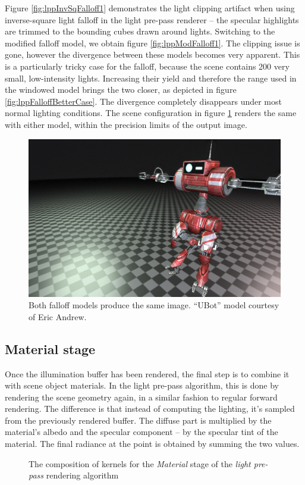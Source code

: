 Figure \ref{fig:lppInvSqFalloff1} demonstrates the light clipping artifact when using inverse-square light falloff in the light pre-pass renderer -- the specular highlights are trimmed to the bounding cubes drawn around lights. Switching to the modified falloff model, we obtain figure \ref{fig:lppModFalloff1}. The clipping issue is gone, however the divergence between these models becomes very apparent. This is a particularly tricky case for the falloff, because the scene contains 200 very small, low-intensity lights. Increasing their yield and therefore the range used in the windowed model brings the two closer, as depicted in figure \ref{fig:lppFalloffBetterCase}. The divergence completely disappears under most normal lighting conditions. The scene configuration in figure \ref{fig:lppFalloffConverged} renders the same with either model, within the precision limits of the output image.

\begin{figure}[h!]
  \centering
    \includegraphics[width=0.45\linewidth]{./Figures/lightPrePass/falloffSame.jpg}
    \caption[Falloffs converged]{Both falloff models produce the same image. ``UBot'' model courtesy of Eric Andrew.}
  \label{fig:lppFalloffConverged}
\end{figure}

\subsection{Material stage}

Once the illumination buffer has been rendered, the final step is to combine it with scene object materials. In the light pre-pass algorithm, this is done by rendering the scene geometry again, in a similar fashion to regular forward rendering. The difference is that instead of computing the lighting, it's sampled from the previously rendered buffer. The diffuse part is multiplied by the material's albedo and the specular component -- by the specular tint of the material. The final radiance at the point is obtained by summing the two values.

\begin{figure}[h!]
  \centering
    \caption[Light Pre-Pass Stage 3]{The composition of kernels for the \emph{Material} stage of the  \emph{light pre-pass} rendering algorithm}
  \label{fig:DeferredLightingStage3}
\end{figure}

